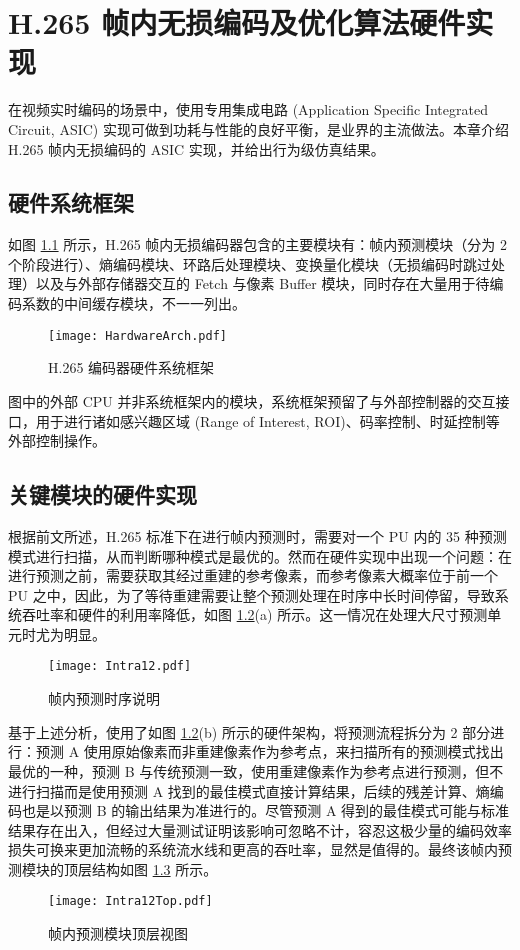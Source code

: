 \chapter{H.265 帧内无损编码及优化算法硬件实现}
\label{cha:c4}
在视频实时编码的场景中，使用专用集成电路 (Application Specific Integrated Circuit, ASIC) 实现可做到功耗与性能的良好平衡，是业界的主流做法。本章介绍 H.265 帧内无损编码的 ASIC 实现，并给出行为级仿真结果。

\section{硬件系统框架}
如图 \ref{fig:HardwareArch} 所示，H.265 帧内无损编码器包含的主要模块有：帧内预测模块（分为 2 个阶段进行）、熵编码模块、环路后处理模块、变换量化模块（无损编码时跳过处理）以及与外部存储器交互的 Fetch 与像素 Buffer 模块，同时存在大量用于待编码系数的中间缓存模块，不一一列出。
\begin{figure}[hbt]
    \centering
    \texttt{[image: HardwareArch.pdf]}
    \caption{H.265 编码器硬件系统框架}
    \label{fig:HardwareArch}
\end{figure}

图中的外部 CPU 并非系统框架内的模块，系统框架预留了与外部控制器的交互接口，用于进行诸如感兴趣区域 (Range of Interest, ROI)、码率控制、时延控制等外部控制操作。

\section{关键模块的硬件实现}

根据前文所述，H.265 标准下在进行帧内预测时，需要对一个 PU 内的 35 种预测模式进行扫描，从而判断哪种模式是最优的。然而在硬件实现中出现一个问题：在进行预测之前，需要获取其经过重建的参考像素，而参考像素大概率位于前一个 PU 之中，因此，为了等待重建需要让整个预测处理在时序中长时间停留，导致系统吞吐率和硬件的利用率降低，如图 \ref{fig:Intra12}(a) 所示。这一情况在处理大尺寸预测单元时尤为明显。
\begin{figure}[hbt]
    \centering
    \texttt{[image: Intra12.pdf]}
    \caption{帧内预测时序说明}
    \label{fig:Intra12}
\end{figure}
基于上述分析，使用了如图 \ref{fig:Intra12}(b) 所示的硬件架构，将预测流程拆分为 2 部分进行：预测 A 使用原始像素而非重建像素作为参考点，来扫描所有的预测模式找出最优的一种，预测 B 与传统预测一致，使用重建像素作为参考点进行预测，但不进行扫描而是使用预测 A 找到的最佳模式直接计算结果，后续的残差计算、熵编码也是以预测 B 的输出结果为准进行的。尽管预测 A 得到的最佳模式可能与标准结果存在出入，但经过大量测试证明该影响可忽略不计，容忍这极少量的编码效率损失可换来更加流畅的系统流水线和更高的吞吐率，显然是值得的。最终该帧内预测模块的顶层结构如图 \ref{fig:Intra12Top} 所示。
\begin{figure}[hbt]
    \centering
    \texttt{[image: Intra12Top.pdf]}
    \caption{帧内预测模块顶层视图}
    \label{fig:Intra12Top}
\end{figure}

